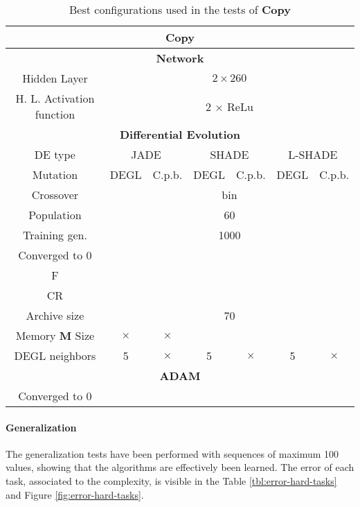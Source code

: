 \begin{table}[!h]
	\centering
	\begin{tabular}{|c|c|c|c|c|c|c|}
		\hline
		\multicolumn{7}{|c|}{\textbf{Copy}} \\ \hline \hline
		\multicolumn{7}{|c|}{\textbf{Network}} \\ \hline
		Hidden Layer & \multicolumn{6}{c|}{$2 \times 260$}\\ \hline
		H. L. Activation function & \multicolumn{6}{c|}{2 $\times$ ReLu}\\ \hline \hline
		\multicolumn{7}{|c|}{\textbf{Differential Evolution}} \\ \hline
		DE type & \multicolumn{2}{c|}{JADE} & \multicolumn{2}{c|}{SHADE} & \multicolumn{2}{c|}{L-SHADE}  \\ \hline
		Mutation & DEGL & C.p.b. & DEGL & C.p.b. & DEGL & C.p.b. \\ \hline
		Crossover & \multicolumn{6}{c|}{bin} \\ \hline
		Population & \multicolumn{6}{c|}{60} \\ \hline
		Training gen. & \multicolumn{6}{c|}{1000} \\ \hline
		Converged to 0 & & & & & & \\ \hline
		F & & & & & &\\ \hline
		CR & & & & & &\\ \hline
		Archive size & \multicolumn{6}{c|}{70} \\ \hline
		Memory \textbf{M} Size & $\times$ & $\times$ & & & &\\ \hline
		DEGL neighbors & 5 & $\times$ & 5 & $\times$ & 5 & $\times$  \\ \hline\hline
		\multicolumn{7}{|c|}{\textbf{ADAM}} \\ \hline
		Converged to 0 & \multicolumn{6}{|c|}{\checkmark} \\ \hline
 	\end{tabular}
	\caption{Best configurations used in the tests of \textbf{Copy}}
	\label{tbl:tests-configurations-copy}
\end{table}

\paragraph{Generalization}
The generalization tests have been performed with sequences of maximum 100 values, showing that the algorithms are effectively been learned. The error of each task, associated to the complexity, is visible in the Table \ref{tbl:error-hard-tasks} and Figure \ref{fig:error-hard-tasks}.


